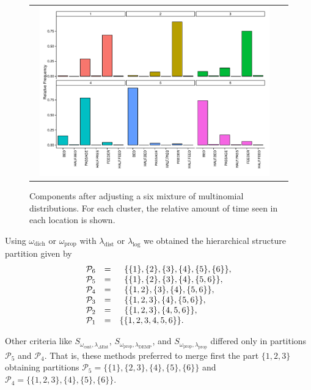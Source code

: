 \documentclass[submit]{smj}
\theoremstyle{definition}
\begin{document}
\begin{figure}[!t]
\begin{center}
\begin{tabular}{cc}
  \includegraphics[width=0.95\textwidth]{figures/multinomial_mixt_all.pdf} \\
 \end{tabular}
 \caption{Components after adjusting a six mixture of multinomial distributions. For each cluster, the relative amount of time seen in each location is shown.}\label{multinomial_mixture}
\end{center}
\end{figure}

Using $\omega_{\text{dich}}$ or  $\omega_{\text{prop}}$ with $\lambda_{\text{dist}}$ or $\lambda_{\log}$ we obtained the hierarchical structure partition given by
\begin{equation}
\begin{array}{r c l}
 \mathcal{P}_6&=& \;\; \{\{1\},\{2\},\{3\},\{4\},\{5\},\{6\}\}, \\
 \mathcal{P}_5&=& \;\; \{\{1\},\{2\},\{3\},\{4\},\{5,6\}\}, \\ 
 \mathcal{P}_4&=& \;\; \{\{1,2\},\{3\},\{4\},\{5,6\}\}, \\ 
 \mathcal{P}_3&=& \;\; \{\{1,2,3\},\{4\},\{5,6\}\}, \\ 
 \mathcal{P}_2&=& \;\; \{\{1,2,3\},\{4,5,6\}\}, \\ 
 \mathcal{P}_1&=& \{\{1,2,3,4,5,6\}\}.
\end{array}
\label{hier_ex_multinomial}
\end{equation}

Other criteria like $S_{\omega_{\text{csnt}},\lambda_{\Delta\text{Ent}}}$,  $S_{\omega_{\text{prop}},\lambda_{\text{DEMP}}}$,  and $S_{\omega_{\text{prop}},\lambda_{\text{prop}}}$ differed only in partitions $\mathcal{P}_5$ and $\mathcal{P}_4$.  That is, these methods preferred to merge first the part $\{1,2,3\}$ obtaining partitions $\mathcal{P}_5 = \{\{1\},\{2, 3\},\{4\},\{5\} ,\{6\}\}$ and $\mathcal{P}_4 = \{\{1,2,3\},\{4\},\{5\},\{6\}\}$.
\end{document}

